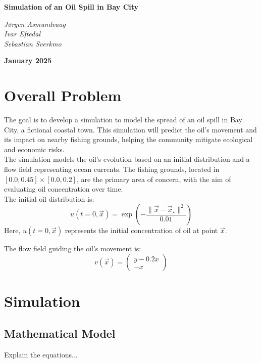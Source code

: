 \documentclass{article}
\begin{document}
\begin{titlepage}
\centering
\vspace*{1cm} 
{\Large \textbf{Simulation of an Oil Spill in Bay City} \par} 
\vspace{1.5cm} 
{\large
\textit{Jørgen Asmundvaag \\ 
Ivar Eftedal \\ 
Sebastian Sverkmo} \par}
\vspace{1.5cm} 
{\large \textbf{January 2025} \par}
\vspace*{\fill} 
\end{titlepage}

\newpage
\tableofcontents
\newpage

\section{Overall Problem}
The goal is to develop a simulation to model the spread of an oil spill in Bay City, a fictional coastal town. This simulation will predict the oil's movement and its impact on nearby fishing grounds, helping the community mitigate ecological and economic risks.\\
The simulation models the oil's evolution based on an initial distribution and a flow field representing ocean currents. The fishing grounds, located in $[0.0, 0.45] \times [0.0, 0.2]$, are the primary area of concern, with the aim of evaluating oil concentration over time.\\
The initial oil distribution is:
\begin{equation}
u(t=0, \vec{x}) = \exp\left(-\frac{\|\vec{x} - \vec{x}_\star\|^2}{0.01}\right)
\end{equation}
Here, $u(t=0, \vec{x})$ represents the initial concentration of oil at point $\vec{x}$.

The flow field guiding the oil's movement is:
\begin{equation}
v(\vec{x}) = 
\begin{pmatrix}
y - 0.2x \\
-x
\end{pmatrix}
\end{equation}

\section{Simulation}
\subsection{Mathematical Model}
Explain the equations...
\end{document}
